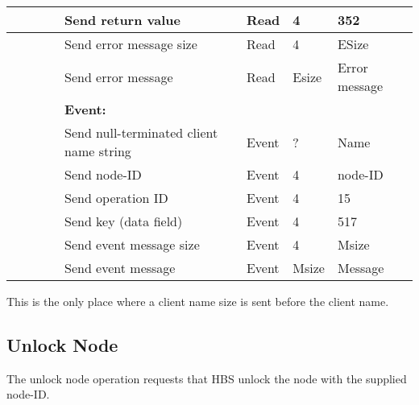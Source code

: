 \begin{tabular}{|p{1.2in}|p{.4in}|p{.4in}|p{.5in}|p{1.2in}|p{.4in}|p{.4in}|p{.5in} |}
                  &        &       &       & Send return
                                             value        & Read   &  4    & 352       \\ \hline
                  &        &       &       & Send error message size & Read &  4    &  ESize \\ \hline
                  &        &       &       & Send error message   & Read   & Esize &  Error message \\ \hline
\multicolumn{4}{|l}{~}&\multicolumn{4}{|l|}{{\bf Event:}} \\ \hline
                  &        &       &       & Send null-terminated client
                                             name string  & Event  &  ?    & Name  \\ \hline
                  &        &       &       & Send node-ID  & Event  &   4   &   node-ID    \\  \hline
                  &        &       &       & Send operation 
                                             ID           & Event  &   4   &  15   \\ \hline
                  &        &       &       & Send key (data field)    & Event  &   4   &  517    \\ \hline
                  &        &       &       & Send event message
                                                  size    & Event  &   4   &  Msize \\ \hline
                  &        &       &       & Send event message
                                                          & Event  & Msize & Message  \\ \hline
\end{tabular}
\normalsize
\bigskip

This is the only place where a client name size is sent before the client name. 



\newpage
\subsection{Unlock Node}

The unlock node operation requests that HBS unlock the 
node with the supplied node-ID.



